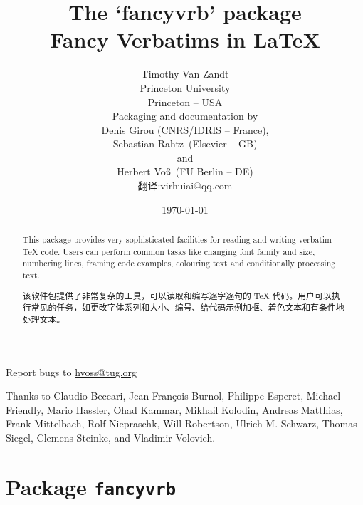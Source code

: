 \documentclass[twoside]{article}
\title{The `\textsf{fancyvrb}' package\\Fancy Verbatims in \LaTeX}
\author{Timothy Van Zandt\\Princeton University\\Princeton -- USA\\[5mm]
        {Packaging and documentation by}\\
        {\footnotesize Denis Girou (CNRS/IDRIS -- France),}\\[-2mm]
        {\footnotesize Sebastian Rahtz\dagger\ (Elsevier -- GB)}\\[-2mm]
        {\footnotesize and}\\[-2mm]
        {\footnotesize Herbert Voß\ (FU Berlin -- DE)}\\[-2mm]
        {\footnotesize 翻译:virhuiai@qq.com}
        }
\date{\today}
\begin{document}
\parindent=0pt
\maketitle
%
\begin{abstract}
\hspace*{-\parindent}%
This package provides very sophisticated facilities for reading and
writing verbatim \TeX{} code. Users can perform common tasks like changing
font family and size, numbering lines, framing code examples, colouring
text and conditionally processing text.

\hspace*{-\parindent}%
该软件包提供了非常复杂的工具，可以读取和编写逐字逐句的 \TeX{} 代码。用户可以执行常见的任务，如更改字体系列和大小、编号、给代码示例加框、着色文本和有条件地处理文本。

    
\end{abstract}

\begin{center}
Report bugs to \url{hvoss@tug.org}
\end{center}

\vfill
Thanks to 
Claudio Beccari,
Jean-François Burnol, 
Philippe Esperet, %
Michael Friendly, %
Mario Hassler, %
Ohad Kammar, %
Mikhail Kolodin, %
Andreas Matthias,
Frank Mittelbach,
Rolf Niepraschk, %
Will Robertson,
Ulrich M. Schwarz, 
Thomas Siegel, %
Clemens Steinke,
and 
Vladimir Volovich. %
\clearpage
\tableofcontents
\clearpage


\part{Package \texttt{fancyvrb}}
\end{document}
